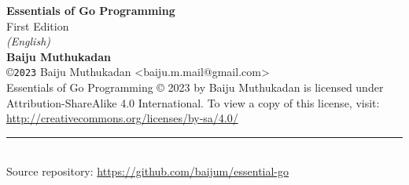 \newpage
{}

{\sf\bfseries Essentials of Go Programming }\\
{\sf First Edition}\\
\textit{(English)}\\[3mm]
{\sf\bfseries Baiju Muthukadan}\\[.1in]
{\small \copyright}{\small \tt 2023} {\small Baiju Muthukadan <baiju.m.mail@gmail.com>}\\

Essentials of Go Programming {\small \copyright} 2023 by Baiju Muthukadan is licensed
under Attribution-ShareAlike 4.0 International. To view a copy of this license,
visit:\\
\url{http://creativecommons.org/licenses/by-sa/4.0/}

\rule{200pt}{0.4pt}\\[3mm]

Source repository: \url{https://github.com/baijum/essential-go}
